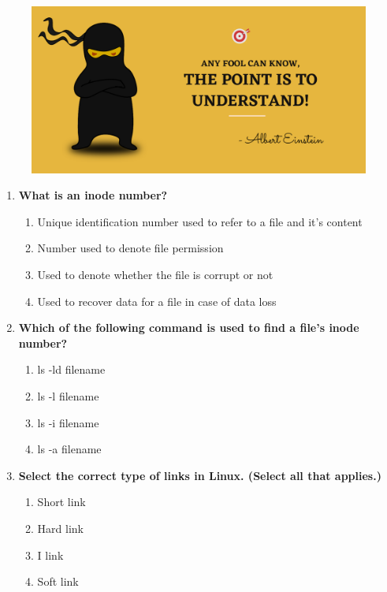 \setlength{\columnsep}{3pt}
\begin{flushleft}
	
	\paragraph{}
	\bigskip
	
	\begin{figure}[h!]
		\centering
		\includegraphics[scale=.2]{content/practise.jpg}
	\end{figure}	
	\begin{enumerate}
		
		\item \textbf{What is an inode number?}
		\begin{enumerate}[label=(\alph*)]
			\item Unique identification number used to refer to a file and it's content %
			\item Number used to denote file permission
			\item Used to denote whether the file is corrupt or not
			\item Used to recover data for a file in case of data loss
		\end{enumerate}
		\bigskip
		\bigskip
		
		\item \textbf{Which of the following command is used to find a file's inode number?}
		\begin{enumerate}[label=(\alph*)]
			\item ls -ld filename
			\item ls -l filename
			\item ls -i filename %
			\item ls -a filename
		\end{enumerate}
		\bigskip
		\bigskip	
		
		\item \textbf{Select the correct type of links in Linux. (Select all that applies.)}
		\begin{enumerate}[label=(\alph*)]
			\item Short link
			\item Hard link  %
			\item I link
			\item Soft link %
		\end{enumerate}
		\bigskip
		\bigskip	


\end{enumerate}
\end{flushleft}
